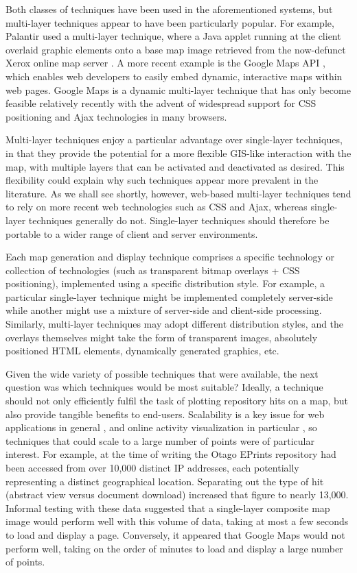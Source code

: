\documentclass[acmnow]{acmtrans2m}
\begin{document}
Both classes of techniques have been used in the aforementioned systems,
but multi-layer techniques appear to have been particularly popular. For
example, Palantir used a multi-layer technique, where a Java applet running
at the client overlaid graphic elements onto a base map image retrieved
from the now-defunct Xerox online map server
\cite{Papa-N-1998-Palantir}. A more recent example is the Google Maps
API \cite{Goog-M-2006-maps}, which enables web developers to easily
embed dynamic, interactive maps within web pages. Google Maps is a
dynamic multi-layer technique that has only become feasible relatively
recently with the advent of widespread support for CSS positioning and
Ajax technologies in many browsers.

Multi-layer techniques enjoy a particular advantage over single-layer
techniques, in that they provide the potential for a more flexible
GIS-like interaction with the map, with multiple layers that can be
activated and deactivated as desired. This flexibility could explain why
such techniques appear more prevalent in the literature. As we shall see
shortly, however, web-based multi-layer techniques tend to rely on more
recent web technologies such as CSS and Ajax, whereas single-layer
techniques generally do not. Single-layer techniques should therefore be
portable to a wider range of client and server environments.

Each map generation and display technique comprises a specific
technology or collection of technologies (such as transparent bitmap
overlays + CSS positioning), implemented using a specific distribution
style. For example, a particular single-layer technique might be
implemented completely server-side while another might use a mixture of
server-side and client-side processing. Similarly, multi-layer
techniques may adopt different distribution styles, and the overlays
themselves might take the form of transparent images, absolutely
positioned HTML elements, dynamically generated graphics, etc.

Given the wide variety of possible techniques that were available, the
next question was which techniques would be most suitable? Ideally, a
technique should not only efficiently fulfil the task of plotting
repository hits on a map, but also provide tangible benefits to
end-users. Scalability is a key issue for web applications in general
\cite[p.\ 28]{Offu-J-2002-quality}, and online activity visualization in
particular \cite[p.\ 50]{Eick-SG-2001-sitevis}, so techniques that could
scale to a large number of points were of particular interest. For
example, at the time of writing the Otago EPrints repository had been
accessed from over 10,000 distinct IP addresses, each potentially
representing a distinct geographical location. Separating out the type
of hit (abstract view versus document download) increased that figure to
nearly 13,000. Informal testing with these data suggested that a
single-layer composite map image would perform well with this volume of
data, taking at most a few seconds to load and display a page.
Conversely, it appeared that Google Maps would not perform well, taking
on the order of minutes to load and display a large number of points.
\end{document}
